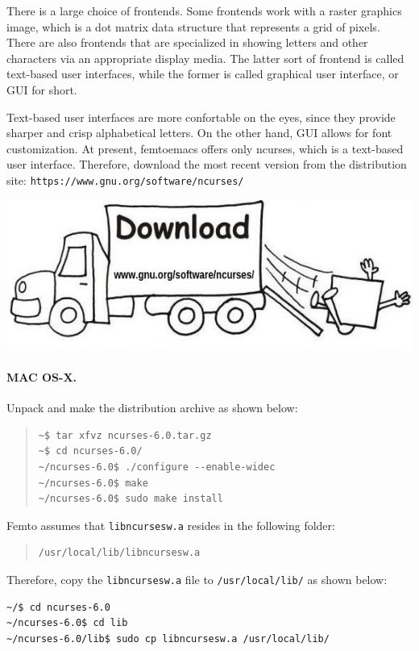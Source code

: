 \documentclass[a4paper,12pt]{book}
\begin{document}
There is a large choice of frontends. Some frontends 
work with a raster graphics image, which  is a dot matrix 
data structure that represents a grid of pixels. 
There are also frontends that are specialized in
showing letters and other characters via an appropriate
display media. The latter sort of frontend is called
text-based user interfaces, while the former is called
graphical user interface, or GUI for short.

Text-based user interfaces are more
confortable on the eyes, since they  provide
sharper and crisp alphabetical letters.
On the other hand, GUI allows for font 
customization. At present,
femtoemacs offers only ncurses, which
is a text-based user interface.
Therefore, download the most recent version 
 from the distribution site:
  \verb|https://www.gnu.org/software/ncurses/|

  \includegraphics[scale=0.6]{figs-prefix/download.jpg}

  
\paragraph{MAC OS-X.}
 Unpack and make the distribution archive as shown below:
\begin{quote}
\begin{verbatim}
~$ tar xfvz ncurses-6.0.tar.gz
~$ cd ncurses-6.0/
~/ncurses-6.0$ ./configure --enable-widec
~/ncurses-6.0$ make
~/ncurses-6.0$ sudo make install
\end{verbatim}
\end{quote}
Femto assumes that  \verb|libncursesw.a|
resides in the following folder:
\begin{quote}
\begin{verbatim}
/usr/local/lib/libncursesw.a 
\end{verbatim}
\end{quote}
Therefore, copy the \verb|libncursesw.a| file
to \verb|/usr/local/lib/| as shown below:
\begin{verbatim}
~/$ cd ncurses-6.0 
~/ncurses-6.0$ cd lib 
~/ncurses-6.0/lib$ sudo cp libncursesw.a /usr/local/lib/
\end{verbatim}
\end{document}
